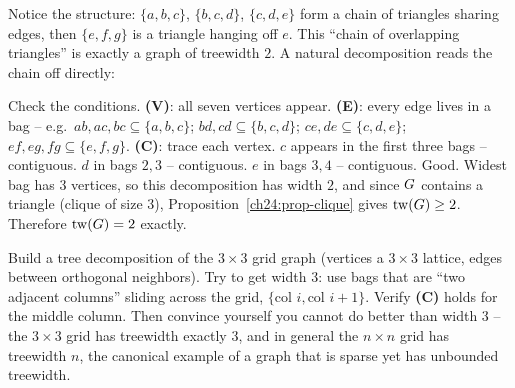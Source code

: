 \begin{center}
\end{center}

Notice the structure: $\{a,b,c\}$, $\{b,c,d\}$, $\{c,d,e\}$ form a chain of
triangles sharing edges, then $\{e,f,g\}$ is a triangle hanging off $e$. This
``chain of overlapping triangles'' is exactly a graph of treewidth $2$. A natural
decomposition reads the chain off directly:

\begin{center}
\end{center}

Check the conditions. \textbf{(V)}: all seven vertices appear. \textbf{(E)}: every
edge lives in a bag -- e.g.\ $ab,ac,bc\subseteq\{a,b,c\}$; $bd,cd\subseteq
\{b,c,d\}$; $ce,de\subseteq\{c,d,e\}$; $ef,eg,fg\subseteq\{e,f,g\}$. \textbf{(C)}:
trace each vertex. $c$ appears in the first three bags -- contiguous. $d$ in bags
$2,3$ -- contiguous. $e$ in bags $3,4$ -- contiguous. Good. Widest bag has $3$
vertices, so this decomposition has width $2$, and since $G$ contains a
triangle (clique of size $3$), Proposition~\ref{ch24:prop-clique} gives
$\operatorname{tw}(G)\ge 2$. Therefore $\operatorname{tw}(G)=2$ exactly.

\begin{labbox}
Build a tree decomposition of the $3\times 3$ grid graph (vertices a $3\times 3$
lattice, edges between orthogonal neighbors). Try to get width $3$: use bags that
are ``two adjacent columns'' sliding across the grid, $\{\text{col }i,\text{col }
i{+}1\}$. Verify \textbf{(C)} holds for the middle column. Then convince yourself
you cannot do better than width $3$ -- the $3\times 3$ grid has treewidth exactly
$3$, and in general the $n\times n$ grid has treewidth $n$, the canonical example
of a graph that is sparse yet has unbounded treewidth.
\end{labbox}

